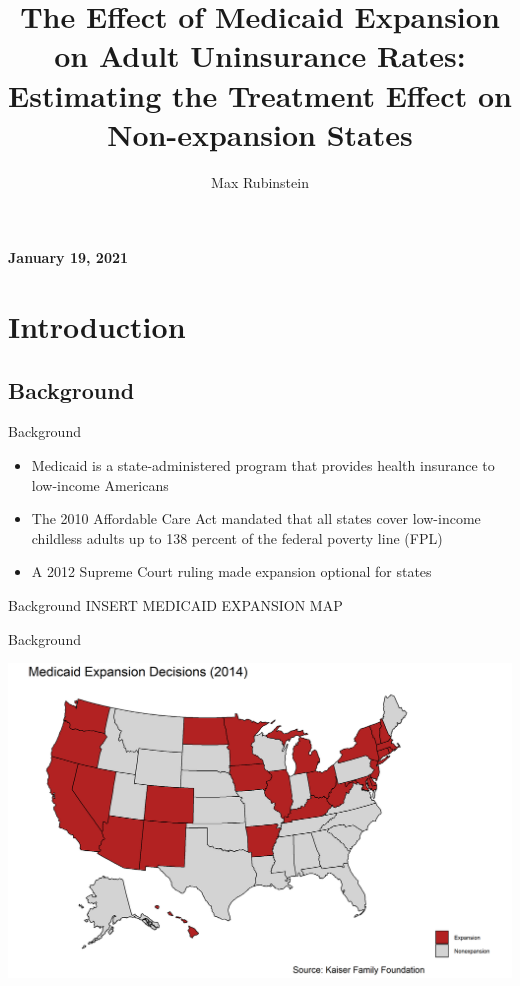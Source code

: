 \documentclass[hyperref={pdfpagelabels=false}]{beamer}
\title{The Effect of Medicaid Expansion on Adult Uninsurance Rates: Estimating the Treatment Effect on Non-expansion States}
\author[shortname]{Max Rubinstein \\}
\institute[]{\and \vspace{-0.26in} \and \vspace{-0.1in}}%
\date{}
\begin{document}

\begin{frame}
\titlepage
\centering 
\vspace{-0.5in}
\textbf{January 19, 2021}
\end{frame} 

\section{Introduction}
\subsection{Background}
\begin{frame}{Background}
\begin{itemize}
    \item Medicaid is a state-administered program that provides health insurance to low-income Americans \bigskip 
    
    \item The 2010 Affordable Care Act mandated that all states cover low-income childless adults up to 138 percent of the federal poverty line (FPL) \bigskip
    
    \item A 2012 Supreme Court ruling made expansion optional for states \bigskip
    
\end{itemize}
\end{frame}

\begin{frame}{Background}
INSERT MEDICAID EXPANSION MAP
\end{frame}

\begin{frame}{Background}
    \begin{center}
	\includegraphics[scale=0.6]{01_Plots/political-expansion-plot.png}
    \end{center}
\end{frame}
\end{document}
